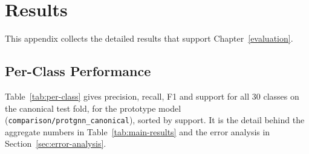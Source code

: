 \appendix

\chapter{Results}\label{app:results}

This appendix collects the detailed results that support Chapter~\ref{evaluation}.

\section{Per-Class Performance}

Table~\ref{tab:per-class} gives precision, recall, F1 and support for all 30
classes on the canonical test fold, for the prototype model
(\texttt{comparison/\allowbreak protgnn\_canonical}), sorted by support. It is
the detail behind the aggregate numbers in Table~\ref{tab:main-results} and the
error analysis in Section~\ref{sec:error-analysis}.

